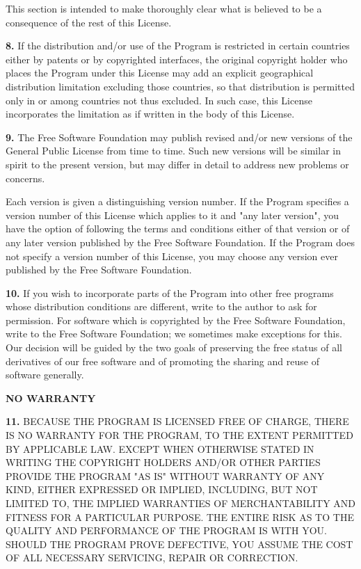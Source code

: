 This section is intended to make thoroughly clear what is believed to be a
consequence of the rest of this License. 

{\bf 8.} If the distribution and/or use of the Program is restricted in
certain countries either by patents or by copyrighted interfaces, the original
copyright holder who places the Program under this License may add an explicit
geographical distribution limitation excluding those countries, so that
distribution is permitted only in or among countries not thus excluded. In
such case, this License incorporates the limitation as if written in the body
of this License. 

{\bf 9.} The Free Software Foundation may publish revised and/or new versions
of the General Public License from time to time. Such new versions will be
similar in spirit to the present version, but may differ in detail to address
new problems or concerns. 

Each version is given a distinguishing version number. If the Program
specifies a version number of this License which applies to it and "any later
version", you have the option of following the terms and conditions either of
that version or of any later version published by the Free Software
Foundation. If the Program does not specify a version number of this License,
you may choose any version ever published by the Free Software Foundation. 

{\bf 10.} If you wish to incorporate parts of the Program into other free
programs whose distribution conditions are different, write to the author to
ask for permission. For software which is copyrighted by the Free Software
Foundation, write to the Free Software Foundation; we sometimes make
exceptions for this. Our decision will be guided by the two goals of
preserving the free status of all derivatives of our free software and of
promoting the sharing and reuse of software generally. 

{\bf NO WARRANTY} 

{\bf 11.} BECAUSE THE PROGRAM IS LICENSED FREE OF CHARGE, THERE IS NO WARRANTY
FOR THE PROGRAM, TO THE EXTENT PERMITTED BY APPLICABLE LAW. EXCEPT WHEN
OTHERWISE STATED IN WRITING THE COPYRIGHT HOLDERS AND/OR OTHER PARTIES PROVIDE
THE PROGRAM "AS IS" WITHOUT WARRANTY OF ANY KIND, EITHER EXPRESSED OR
IMPLIED, INCLUDING, BUT NOT LIMITED TO, THE IMPLIED WARRANTIES OF
MERCHANTABILITY AND FITNESS FOR A PARTICULAR PURPOSE. THE ENTIRE RISK AS TO
THE QUALITY AND PERFORMANCE OF THE PROGRAM IS WITH YOU. SHOULD THE PROGRAM
PROVE DEFECTIVE, YOU ASSUME THE COST OF ALL NECESSARY SERVICING, REPAIR OR
CORRECTION. 

